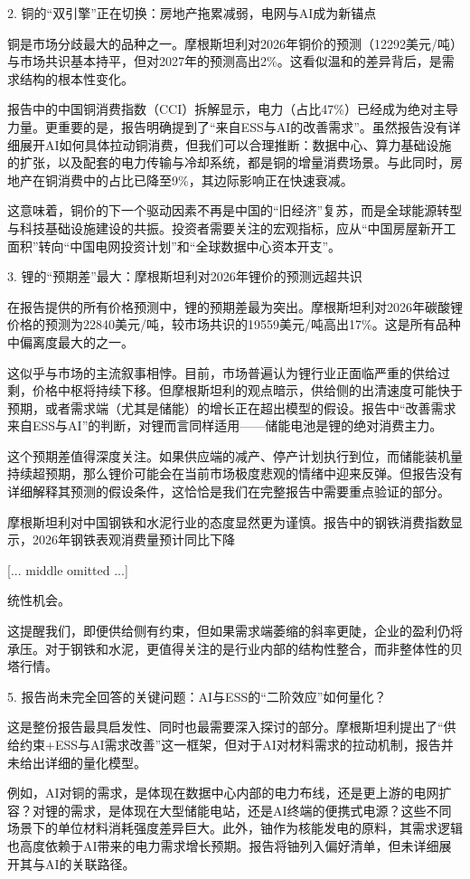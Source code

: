 \documentclass[11pt]{ctexart}
\begin{document}
2. 铜的“双引擎”正在切换：房地产拖累减弱，电网与AI成为新锚点

铜是市场分歧最大的品种之一。摩根斯坦利对2026年铜价的预测（12292美元/吨）与市场共识基本持平，但对2027年的预测高出2\%。这看似温和的差异背后，是需求结构的根本性变化。

报告中的中国铜消费指数（CCI）拆解显示，电力（占比47\%）已经成为绝对主导力量。更重要的是，报告明确提到了“来自ESS与AI的改善需求”。虽然报告没有详细展开AI如何具体拉动铜消费，但我们可以合理推断：数据中心、算力基础设施的扩张，以及配套的电力传输与冷却系统，都是铜的增量消费场景。与此同时，房地产在铜消费中的占比已降至9\%，其边际影响正在快速衰减。

这意味着，铜价的下一个驱动因素不再是中国的“旧经济”复苏，而是全球能源转型与科技基础设施建设的共振。投资者需要关注的宏观指标，应从“中国房屋新开工面积”转向“中国电网投资计划”和“全球数据中心资本开支”。

3. 锂的“预期差”最大：摩根斯坦利对2026年锂价的预测远超共识

在报告提供的所有价格预测中，锂的预期差最为突出。摩根斯坦利对2026年碳酸锂价格的预测为22840美元/吨，较市场共识的19559美元/吨高出17\%。这是所有品种中偏离度最大的之一。

这似乎与市场的主流叙事相悖。目前，市场普遍认为锂行业正面临严重的供给过剩，价格中枢将持续下移。但摩根斯坦利的观点暗示，供给侧的出清速度可能快于预期，或者需求端（尤其是储能）的增长正在超出模型的假设。报告中“改善需求来自ESS与AI”的判断，对锂而言同样适用——储能电池是锂的绝对消费主力。

这个预期差值得深度关注。如果供应端的减产、停产计划执行到位，而储能装机量持续超预期，那么锂价可能会在当前市场极度悲观的情绪中迎来反弹。但报告没有详细解释其预测的假设条件，这恰恰是我们在完整报告中需要重点验证的部分。

摩根斯坦利对中国钢铁和水泥行业的态度显然更为谨慎。报告中的钢铁消费指数显示，2026年钢铁表观消费量预计同比下降

[... middle omitted ...]

统性机会。

这提醒我们，即便供给侧有约束，但如果需求端萎缩的斜率更陡，企业的盈利仍将承压。对于钢铁和水泥，更值得关注的是行业内部的结构性整合，而非整体性的贝塔行情。

5. 报告尚未完全回答的关键问题：AI与ESS的“二阶效应”如何量化？

这是整份报告最具启发性、同时也最需要深入探讨的部分。摩根斯坦利提出了“供给约束+ESS与AI需求改善”这一框架，但对于AI对材料需求的拉动机制，报告并未给出详细的量化模型。

例如，AI对铜的需求，是体现在数据中心内部的电力布线，还是更上游的电网扩容？对锂的需求，是体现在大型储能电站，还是AI终端的便携式电源？这些不同场景下的单位材料消耗强度差异巨大。此外，铀作为核能发电的原料，其需求逻辑也高度依赖于AI带来的电力需求增长预期。报告将铀列入偏好清单，但未详细展开其与AI的关联路径。
\end{document}
